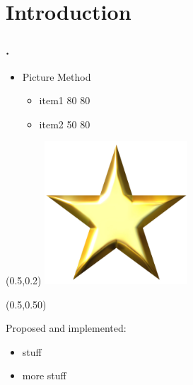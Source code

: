\documentclass[12pt,t]{beamer}
\begin{document}
\section{Introduction}
\begin{frame}
\frametitle{\thesection.~\insertsection}
\begin{itemize}
\item Picture Method
\begin{itemize}
\item item1 80 80 
\item item2 50 80
\end{itemize}
\end{itemize}

\begin{textblock*}{0.45\textwidth}(0.5\textwidth,0.2\textheight)
\includegraphics[width=0.40\textwidth]{star.jpg}
\end{textblock*}

\begin{textblock*}{0.45\textwidth}(0.5\textwidth,0.50\textheight)
\begin{exampleblock}{}
  Proposed and implemented:
  \begin{itemize}
    \item stuff
    \item more stuff
  \end{itemize}
\end{exampleblock}
\end{textblock*}

\end{frame}
\end{document}
